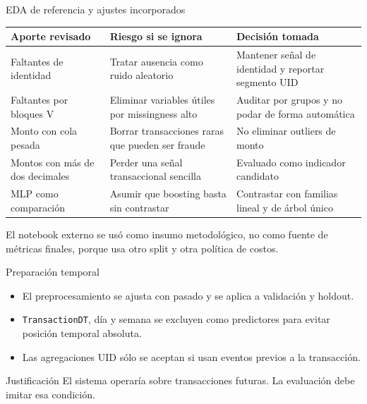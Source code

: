 \documentclass[aspectratio=169,10pt]{beamer}
\begin{document}
\begin{frame}{EDA de referencia y ajustes incorporados}\small
\begin{tabularx}{\linewidth}{@{}>{\raggedright\arraybackslash}p{.30\linewidth}YY@{}}\toprule
Aporte revisado & Riesgo si se ignora & Decisión tomada\\\midrule
Faltantes de identidad & Tratar ausencia como ruido aleatorio & Mantener señal de identidad y reportar segmento UID\\
Faltantes por bloques V & Eliminar variables útiles por missingness alto & Auditar por grupos y no podar de forma automática\\
Monto con cola pesada & Borrar transacciones raras que pueden ser fraude & No eliminar outliers de monto\\
Montos con más de dos decimales & Perder una señal transaccional sencilla & Evaluado como indicador candidato\\
MLP como comparación & Asumir que boosting basta sin contrastar & Contrastar con familias lineal y de árbol único\\\bottomrule
\end{tabularx}
\vfill
\footnotesize El notebook externo se usó como insumo metodológico, no como fuente de métricas finales, porque usa otro split y otra política de costos.
\end{frame}

\begin{frame}{Preparación temporal}\small
\begin{center}
\end{center}
\begin{itemize}
\item El preprocesamiento se ajusta con pasado y se aplica a validación y holdout.
\item \texttt{TransactionDT}, día y semana se excluyen como predictores para evitar posición temporal absoluta.
\item Las agregaciones UID sólo se aceptan si usan eventos previos a la transacción.
\end{itemize}
\begin{block}{Justificación}
El sistema operaría sobre transacciones futuras. La evaluación debe imitar esa condición.
\end{block}
\end{frame}
\end{document}
